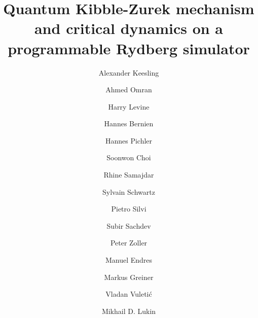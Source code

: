 \documentclass[prl,nobalancelastpage,superscriptaddress,twocolumn,nofootinbib]{revtex4}
\begin{document}
\title{
Quantum Kibble-Zurek mechanism and critical dynamics on a programmable Rydberg simulator
}


\newcommand{\emptyaddress}{}
\newcommand{\Caltech}{Division of Physics, Mathematics and Astronomy, California Institute of Technology, Pasadena, CA 91125, USA}
\newcommand{\Harvard}{Department of Physics, Harvard University, Cambridge, MA 02138,
USA}
\newcommand{\MIT}{Department of Physics and Research Laboratory of Electronics, Massachusetts Institute of Technology,
Cambridge, MA 02139, USA}
\newcommand{\ITAMP}{ITAMP, Harvard-Smithsonian Center for Astrophysics, Cambridge, MA 02138, USA}
\newcommand{\LKB}{Laboratoire Kastler Brossel, ENS, CNRS, Sorbonne Universit\'e, Coll\`ege de France, Paris, France }
\newcommand{\IQOQI}{Institute for Quantum Optics and Quantum Information, Austrian Academy of Sciences \& Center for Quantum Physics, University of Innsbruck, Innsbruck A-6020, Austria}


\author{Alexander Keesling}
\address{\Harvard}

\author{Ahmed Omran}
\address{\Harvard}

\author{Harry Levine}
\address{\Harvard}

\author{Hannes Bernien}
\address{\Harvard}

\author{Hannes Pichler}
\address{\Harvard}
\address{\ITAMP}

\author{Soonwon Choi}
\address{\Harvard}

\author{Rhine Samajdar}
\address{\Harvard}

\author{Sylvain Schwartz}
\address{\LKB}

\author{Pietro Silvi}
\address{\IQOQI}

\author{Subir Sachdev}
\address{\Harvard}

\author{Peter Zoller}
\address{\IQOQI}

\author{Manuel Endres}
\address{\Caltech}

\author{Markus Greiner}
\address{\Harvard}

\author{Vladan Vuleti{\'c}}
\address{\MIT}

\author{Mikhail D. Lukin}
\address{\Harvard}

\maketitle
\end{document}
